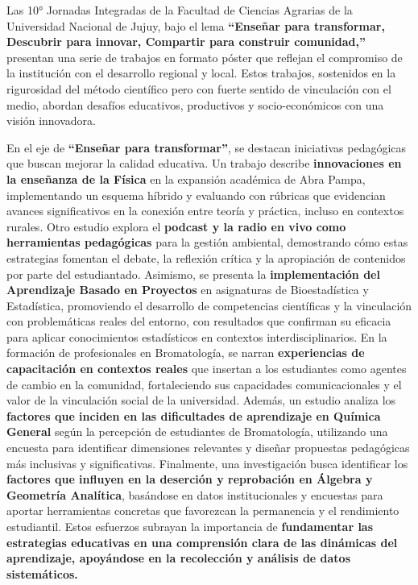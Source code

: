 \documentclass[
  spanish,
  letterpaper,
  DIV=11,
  numbers=noendperiod]{scrreprt}
\begin{document}

Las 10° Jornadas Integradas de la Facultad de Ciencias Agrarias de la
Universidad Nacional de Jujuy, bajo el lema \textbf{``Enseñar para
transformar, Descubrir para innovar, Compartir para construir
comunidad,''} presentan una serie de trabajos en formato póster que
reflejan el compromiso de la institución con el desarrollo regional y
local. Estos trabajos, sostenidos en la rigurosidad del método
científico pero con fuerte sentido de vinculación con el medio, abordan
desafíos educativos, productivos y socio-económicos con una visión
innovadora.

En el eje de \textbf{``Enseñar para transformar''}, se destacan
iniciativas pedagógicas que buscan mejorar la calidad educativa. Un
trabajo describe \textbf{innovaciones en la enseñanza de la Física} en
la expansión académica de Abra Pampa, implementando un esquema híbrido y
evaluando con rúbricas que evidencian avances significativos en la
conexión entre teoría y práctica, incluso en contextos rurales. Otro
estudio explora el \textbf{podcast y la radio en vivo como herramientas
pedagógicas} para la gestión ambiental, demostrando cómo estas
estrategias fomentan el debate, la reflexión crítica y la apropiación de
contenidos por parte del estudiantado. Asimismo, se presenta la
\textbf{implementación del Aprendizaje Basado en Proyectos} en
asignaturas de Bioestadística y Estadística, promoviendo el desarrollo
de competencias científicas y la vinculación con problemáticas reales
del entorno, con resultados que confirman su eficacia para aplicar
conocimientos estadísticos en contextos interdisciplinarios. En la
formación de profesionales en Bromatología, se narran
\textbf{experiencias de capacitación en contextos reales} que insertan a
los estudiantes como agentes de cambio en la comunidad, fortaleciendo
sus capacidades comunicacionales y el valor de la vinculación social de
la universidad. Además, un estudio analiza los \textbf{factores que
inciden en las dificultades de aprendizaje en Química General} según la
percepción de estudiantes de Bromatología, utilizando una encuesta para
identificar dimensiones relevantes y diseñar propuestas pedagógicas más
inclusivas y significativas. Finalmente, una investigación busca
identificar los \textbf{factores que influyen en la deserción y
reprobación en Álgebra y Geometría Analítica}, basándose en datos
institucionales y encuestas para aportar herramientas concretas que
favorezcan la permanencia y el rendimiento estudiantil. Estos esfuerzos
subrayan la importancia de \textbf{fundamentar las estrategias
educativas en una comprensión clara de las dinámicas del aprendizaje,
apoyándose en la recolección y análisis de datos sistemáticos.}
\end{document}
